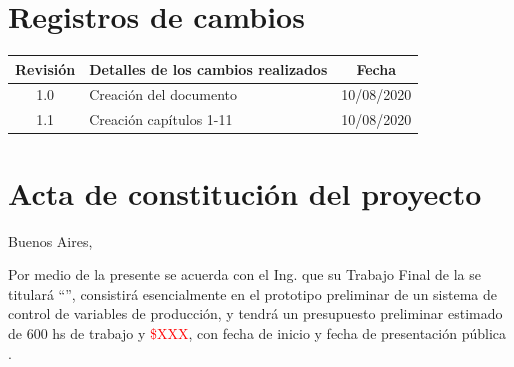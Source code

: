\documentclass[11pt]{charter}
\begin{document}
\maketitle
\thispagestyle{empty}
\pagebreak


\thispagestyle{empty}
{\setlength{\parskip}{0pt}
\tableofcontents{}
}
\pagebreak


\section{Registros de cambios}
\label{sec:registro}


\begin{table}[ht]
\label{tab:registro}
\centering
\begin{tabularx}{\linewidth}{@{}|c|X|c|@{}}
\hline
\rowcolor[HTML]{C0C0C0} 
Revisión & \multicolumn{1}{c|}{\cellcolor[HTML]{C0C0C0}Detalles de los cambios realizados} & Fecha      \\ \hline
1.0      & Creación del documento                                          & 10/08/2020 \\ \hline
1.1 	 & Creación capítulos 1-11										   & 10/08/2020 \\ \hline
\end{tabularx}
\end{table}

\pagebreak



\section{Acta de constitución del proyecto}
\label{sec:acta}

\begin{flushright}
Buenos Aires, \fechaInicioName
\end{flushright}

\vspace{2cm}

Por medio de la presente se acuerda con el Ing. \authorname\hspace{1px} que su Trabajo Final de la \degreename\hspace{1px} se titulará ``\ttitle'', consistirá esencialmente en el prototipo preliminar de un sistema de control de variables de producción, y tendrá un presupuesto preliminar estimado de 600 hs de trabajo y \textcolor{red}{\$XXX}, con fecha de inicio \fechaInicioName\hspace{1px} y fecha de presentación pública \fechaFinalName.
\end{document}
